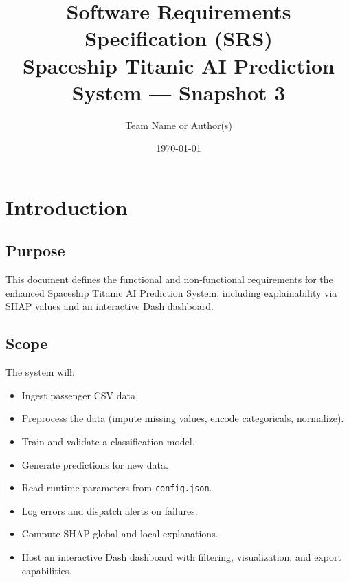 \documentclass[15pt]{article}
\title{Software Requirements Specification (SRS)\\\large Spaceship Titanic AI Prediction System — Snapshot 3}
\author{Team Name or Author(s)}
\date{\today}
\begin{document}
\maketitle
\tableofcontents
\newpage

\section{Introduction}

\subsection{Purpose}
This document defines the functional and non-functional requirements for the enhanced Spaceship Titanic AI Prediction System, including explainability via SHAP values and an interactive Dash dashboard.

\subsection{Scope}
The system will:
\begin{itemize}
  \item Ingest passenger CSV data.
  \item Preprocess the data (impute missing values, encode categoricals, normalize).
  \item Train and validate a classification model.
  \item Generate predictions for new data.
  \item Read runtime parameters from \texttt{config.json}.
  \item Log errors and dispatch alerts on failures.
  \item Compute SHAP global and local explanations.
  \item Host an interactive Dash dashboard with filtering, visualization, and export capabilities.
\end{itemize}
\end{document}
